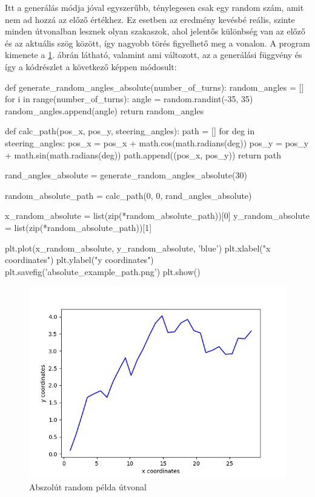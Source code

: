 Itt a generálás módja jóval egyszerűbb, ténylegesen csak egy random szám, amit nem ad hozzá az előző értékhez. Ez esetben az eredmény kevésbé reális, szinte minden útvonalban lesznek olyan szakaszok, ahol jelentős különbség van az előző és az aktuális szög között, így nagyobb törés figyelhető meg a vonalon. A program kimenete a \ref{fig:absolute_path}. ábrán látható, valamint ami változott, az a generálási függvény és így a kódrészlet a következő képpen módosult:
\begin{python}
def generate_random_angles_absolute(number_of_turns):
    random_angles = []
    for i in range(number_of_turns):
        angle = random.randint(-35, 35)
        random_angles.append(angle)
    return random_angles
    
def calc_path(pos_x, pos_y, steering_angles):
    path = []
    for deg in steering_angles:
        pos_x = pos_x + math.cos(math.radians(deg))
        pos_y = pos_y + math.sin(math.radians(deg))
        path.append((pos_x, pos_y))
    return path
    
rand_angles_absolute = generate_random_angles_absolute(30)

random_absolute_path = calc_path(0, 0, rand_angles_absolute)

x_random_absolute = list(zip(*random_absolute_path))[0]
y_random_absolute = list(zip(*random_absolute_path))[1]

plt.plot(x_random_absolute, y_random_absolute, 'blue')
plt.xlabel("x coordinates")
plt.ylabel("y coordinates")
plt.savefig('absolute_example_path.png')
plt.show()
\end{python}

\begin{figure}[h!]
\centering
\includegraphics[scale=0.75]{images/absolute_example_path.png}
\caption{Abszolút random példa útvonal}
\label{fig:absolute_path}
\end{figure}

